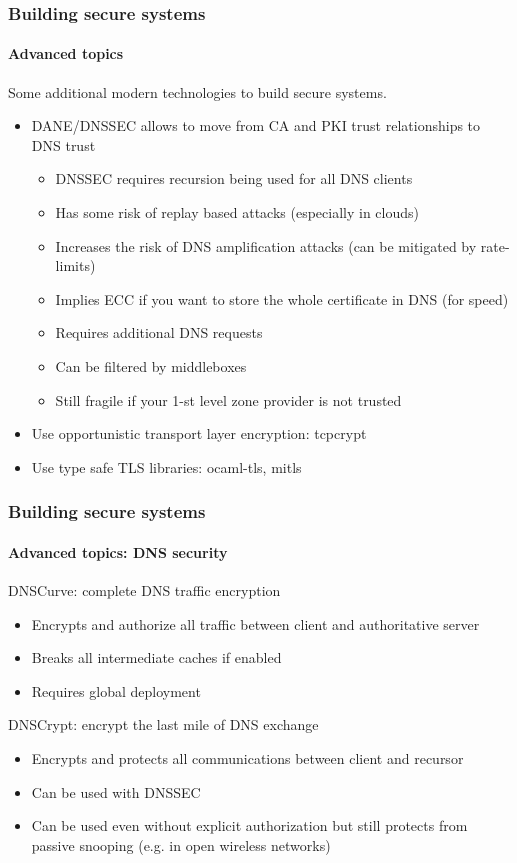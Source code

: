 \documentclass[11pt,t]{beamer}
\begin{document}
\begin{frame}[fragile]
\frametitle{Building secure systems}
\framesubtitle{Advanced topics}
Some additional modern technologies to build secure systems.
\begin{itemize}
\item DANE/DNSSEC allows to move from CA and PKI trust relationships to DNS trust
\begin{itemize}
\item DNSSEC requires recursion being used for all DNS clients
\item Has some risk of replay based attacks (especially in clouds)
\item Increases the risk of DNS amplification attacks (can be mitigated by rate-limits)
\item Implies ECC if you want to store the whole certificate in DNS (for speed)
\item Requires additional DNS requests
\item Can be filtered by middleboxes
\item Still fragile if your 1-st level zone provider is not trusted
\end{itemize}
\item Use opportunistic transport layer encryption: tcpcrypt
\item Use type safe TLS libraries: ocaml-tls, mitls
\end{itemize}
\end{frame}

\begin{frame}[fragile]
\frametitle{Building secure systems}
\framesubtitle{Advanced topics: DNS security}
DNSCurve: complete DNS traffic encryption
\begin{itemize}
\item Encrypts and authorize all traffic between client and authoritative server
\item Breaks all intermediate caches if enabled
\item Requires global deployment
\end{itemize}
DNSCrypt: encrypt the last mile of DNS exchange
\begin{itemize}
\item Encrypts and protects all communications between client and recursor
\item Can be used with DNSSEC
\item Can be used even without explicit authorization but still protects from passive 
snooping (e.g. in open wireless networks)
\end{itemize}
\end{frame}
\end{document}
